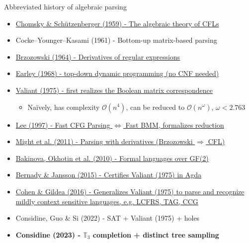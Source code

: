 \documentclass{beamer}
\begin{document}
\begin{frame}{Abbreviated history of algebraic parsing}
\begin{itemize}
\item \href{http://www-igm.univ-mlv.fr/~berstel/Mps/Travaux/A/1963-7ChomskyAlgebraic.pdf}{Chomsky \& Sch\"utzenberger (1959) - The algebraic theory of CFLs}
\item Cocke–Younger–Kasami (1961) - Bottom-up matrix-based parsing
\item \href{https://dl.acm.org/doi/10.1145/321239.321249}{Brzozowski (1964) - Derivatives of regular expressions}
\item \href{https://dl.acm.org/doi/10.1145/362007.362035}{Earley (1968) - top-down dynamic programming (no CNF needed)}
\item \href{http://theory.stanford.edu/~virgi/cs367/papers/valiantcfg.pdf}{Valiant (1975) - first realizes the Boolean matrix correspondence}
\begin{itemize}
\item Na\"ively, has complexity $\mathcal{O}(n^4)$, can be reduced to $\mathcal{O}(n^\omega)$, $\omega < 2.763$
\end{itemize}
\item \href{https://www.cs.cornell.edu/home/llee/papers/bmmcfl-jacm.pdf}{Lee (1997) - Fast CFG Parsing $\Longleftrightarrow$ Fast BMM, formalizes reduction}
\item \href{https://matt.might.net/papers/might2011derivatives.pdf}{Might et al. (2011) - Parsing with derivatives (Brzozowski $\Rightarrow$ CFL)}
\item \href{https://users.math-cs.spbu.ru/~okhotin/papers/formal_languages_gf2.pdf}{Bakinova, Okhotin et al. (2010) - Formal languages over GF(2)}
\item \href{https://arxiv.org/pdf/1601.07724.pdf}{Bernady \& Jansson (2015) - Certifies Valiant (1975) in Agda}
\item \href{https://arxiv.org/pdf/1504.08342.pdf}{Cohen \& Gildea (2016) - Generalizes Valiant (1975) to parse and recognize mildly context sensitive languages, e.g. LCFRS, TAG, CCG}
\item Considine, Guo \& Si (2022) - SAT + Valiant (1975) + holes
\item \textbf{Considine (2023) - $\mathbb{T}_3$ completion + distinct tree sampling}
\end{itemize}
\end{frame}
\end{document}
